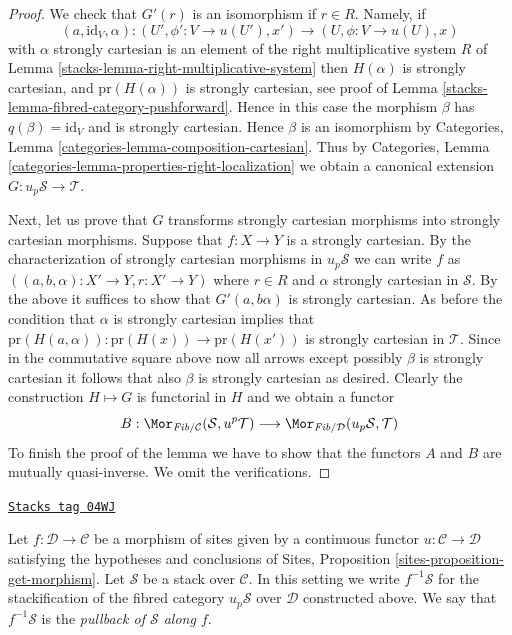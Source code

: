 \begin{proof}
\medskip\noindent
We check that $G'(r)$ is an isomorphism if $r \in R$.
Namely, if
$$
(a, \text{id}_V, \alpha) :
(U', \phi' : V \to u(U'), x')
\longrightarrow
(U, \phi : V \to u(U), x)
$$
with $\alpha$ strongly cartesian is an element of the right multiplicative
system $R$ of
Lemma \ref{stacks-lemma-right-multiplicative-system}
then $H(\alpha)$ is strongly cartesian, and
$\text{pr}(H(\alpha))$ is strongly cartesian, see proof of
Lemma \ref{stacks-lemma-fibred-category-pushforward}.
Hence in this case the morphism $\beta$ has $q(\beta) = \text{id}_V$
and is strongly cartesian. Hence $\beta$ is an isomorphism by
Categories, Lemma \ref{categories-lemma-composition-cartesian}.
Thus by
Categories, Lemma \ref{categories-lemma-properties-right-localization}
we obtain a canonical extension $G : u_p\mathcal{S} \to \mathcal{T}$.

\medskip\noindent
Next, let us prove that $G$ transforms strongly cartesian morphisms
into strongly cartesian morphisms.
Suppose that $f : X \to Y$ is a strongly cartesian. By the characterization
of strongly cartesian morphisms in $u_p\mathcal{S}$ we can write $f$ as
$((a, b, \alpha) : X' \to Y, r : X' \to Y)$ where $r \in R$ and
$\alpha$ strongly cartesian in $\mathcal{S}$. By the above it suffices
to show that $G'(a, b \alpha)$ is strongly cartesian. As before
the condition that $\alpha$ is strongly cartesian implies that
$\text{pr}(H(a, \alpha)) : \text{pr}(H(x)) \to \text{pr}(H(x'))$
is strongly cartesian in $\mathcal{T}$. Since in the commutative
square above now all arrows except possibly $\beta$ is strongly cartesian
it follows that also $\beta$ is strongly cartesian as desired.
Clearly the construction $H \mapsto G$ is functorial in $H$ and we
obtain a functor
$$
B :
\Mor_{\textit{Fib}/\mathcal{C}}(\mathcal{S}, u^p\mathcal{T})
\longrightarrow
\Mor_{\textit{Fib}/\mathcal{D}}(u_p\mathcal{S}, \mathcal{T})
$$
To finish the proof of the lemma we have to show that the functors
$A$ and $B$ are mutually quasi-inverse. We omit the verifications.
\end{proof}

\begin{definition}
\label{stacks-definition-pullback-stack}
\href{https://stacks.math.columbia.edu/tag/04WJ}{\texttt{Stacks tag 04WJ}}

Let $f : \mathcal{D} \to \mathcal{C}$ be a morphism of sites
given by a continuous functor $u : \mathcal{C} \to \mathcal{D}$
satisfying the hypotheses and conclusions of
Sites, Proposition \ref{sites-proposition-get-morphism}.
Let $\mathcal{S}$ be a stack over $\mathcal{C}$.
In this setting we write {\it $f^{-1}\mathcal{S}$} for the stackification
of the fibred category $u_p\mathcal{S}$ over $\mathcal{D}$ constructed
above. We say that $f^{-1}\mathcal{S}$ is the
{\it pullback of $\mathcal{S}$ along $f$}.
\end{definition}

